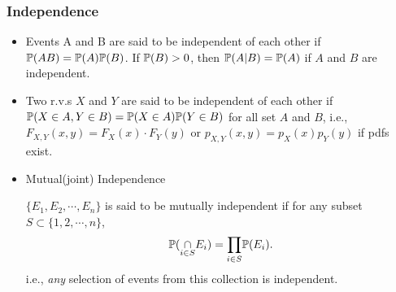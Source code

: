 \documentclass[english,10pt,handout]{beamer}
\begin{document}
\begin{frame}
\frametitle{Independence}
\begin{itemize}
\item Events A and B are said to be independent of each other if
$\mathbb{P}(AB)=\mathbb{P}(A)\mathbb{P}(B)$.
If $\mathbb{P}(B)>0$, then $\mathbb{P}(A|B)=\mathbb{P}(A)$ if $A$ and $B$ are independent.
\item 
Two r.v.s $X$ and $Y$ are said to be independent of each other if
$\mathbb{P}(X\in A, Y\in B)=\mathbb{P}(X\in A)\mathbb{P}(Y\in B)$ for all set $A$ and $B$, i.e.,
$F_{X,Y}(x,y) = F_X(x) \cdot F_Y(y)$ or 
$p_{X,Y}(x,y)=p_X(x)p_Y(y)$ if pdfs exist.

\pause 
\item 
Mutual(joint) Independence


$\{E_1,E_2,\cdots, E_n\}$ is said to be mutually independent if 
for any subset $S\subset\{1,2,\cdots,n\}$,
\[\mathbb{P}(\underset{i\in S}{\cap} E_i) = \underset{i\in S}{\prod}\mathbb{P}(E_i).\]
i.e.,  {\em any} selection of events from  this collection 
is independent. 

\end{itemize}
\end{frame}
\end{document}
